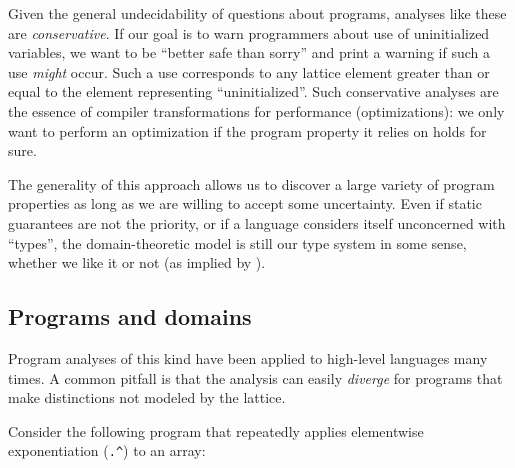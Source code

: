 Given the general undecidability of questions about programs, analyses
like these are \emph{conservative}.
If our goal is to warn programmers about use of uninitialized
variables, we want to be ``better safe than sorry'' and print a warning
if such a use \emph{might} occur.
Such a use corresponds to any lattice element greater than or equal to
the element representing ``uninitialized''.
Such conservative analyses are the essence of compiler transformations
for performance (optimizations): we only want to perform an optimization
if the program property it relies on holds for sure.

The generality of this approach
allows us to discover a large variety of program properties as long as we are
willing to accept some uncertainty.
Even if static guarantees are not the priority, or if a language considers
itself unconcerned with ``types'', the domain-theoretic model is
still our type system in some sense, whether we like it or not
(as implied by \cite{scott1976data}).


\subsection{Programs and domains}
\label{sec:programsanddomains}


Program analyses of this kind have been applied to high-level
languages many times.
A common pitfall is that the analysis can easily \emph{diverge}
for programs that make distinctions not modeled by the lattice.

Consider the following program that repeatedly applies elementwise
exponentiation (\texttt{.\^}) to an array:

